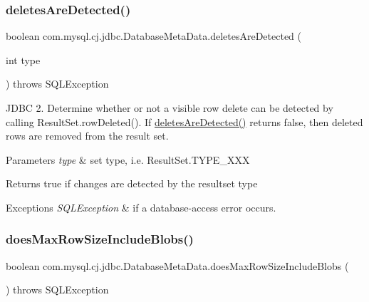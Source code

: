 \subsubsection{\texorpdfstring{deletes\+Are\+Detected()}{deletesAreDetected()}}
{\footnotesize\ttfamily boolean com.\+mysql.\+cj.\+jdbc.\+Database\+Meta\+Data.\+deletes\+Are\+Detected (\begin{DoxyParamCaption}\item[{int}]{type }\end{DoxyParamCaption}) throws S\+Q\+L\+Exception}

J\+D\+BC 2. Determine whether or not a visible row delete can be detected by calling Result\+Set.\+row\+Deleted(). If \mbox{\hyperlink{classcom_1_1mysql_1_1cj_1_1jdbc_1_1_database_meta_data_ada4d6165180e979eeb0645fadd72aaf9}{deletes\+Are\+Detected()}} returns false, then deleted rows are removed from the result set.


\begin{DoxyParams}{Parameters}
{\em type} & set type, i.\+e. Result\+Set.\+T\+Y\+P\+E\+\_\+\+X\+XX \\
\hline
\end{DoxyParams}
\begin{DoxyReturn}{Returns}
true if changes are detected by the resultset type 
\end{DoxyReturn}

\begin{DoxyExceptions}{Exceptions}
{\em S\+Q\+L\+Exception} & if a database-\/access error occurs. \\
\hline
\end{DoxyExceptions}
\mbox{\label{classcom_1_1mysql_1_1cj_1_1jdbc_1_1_database_meta_data_ad8b1533935ccb3f77b745ccce44dd5b9}} 
\subsubsection{\texorpdfstring{does\+Max\+Row\+Size\+Include\+Blobs()}{doesMaxRowSizeIncludeBlobs()}}
{\footnotesize\ttfamily boolean com.\+mysql.\+cj.\+jdbc.\+Database\+Meta\+Data.\+does\+Max\+Row\+Size\+Include\+Blobs (\begin{DoxyParamCaption}{ }\end{DoxyParamCaption}) throws S\+Q\+L\+Exception}


